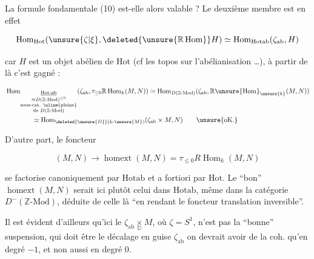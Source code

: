 La formule fondamentale (10) est-elle alors valable ? Le deuxième membre est en effet


\[
\operatorname{Hom}_{\mathrm{Hot}}(\unsure{\zeta|\xi},\deleted{\unsure{\mathbb R\operatorname{Hom}}}H)\simeq
\operatorname{Hom}_{\mathrm{Hotab}}(\zeta_{\mathrm{ab}},H)
\]

car $H$ est un objet abélien de $\mathrm{Hot}$ (cf les topos sur l'abélianisation \ldots), à partir de là c'est gagné :

\[
\begin{aligned}
&\operatorname{Hom}_{\underset{\substack{\approx D(\mathbb Z\text{-}\mathrm{Mod})^{\leq0}\\
\text{sous-cat. }\text{\uline{pleine}}\\\text{de }D(\mathbb Z\text{-}\mathrm{Mod})}}{\underline{\mathrm{Hot}\text{-}\mathrm{ab}}}}
(\zeta_{\mathrm{ab}},\tau_{\leq0}\mathbb R\operatorname{Hom}_k(M,N))
\simeq\operatorname{Hom}_{D(\mathbb Z\text{-}\mathrm{Mod})}
(\zeta_{\mathrm{ab}},\mathbb R\unsure{\operatorname{Hom}}_{\unsure{k}}(M,N))\\
&\hspace{4em}\simeq\operatorname{Hom}_{\deleted{\unsure{D}}(k\text{-}\unsure{M})}(\zeta_{\mathrm{ab}}\times M,N)
\qquad\text{\unsure{oK.}}
\end{aligned}
\]

D'autre part, le foncteur

\[
(M,N)\longrightarrow\operatorname{homext}(M,N)=\tau_{\leq0}R\operatorname{Hom}_k(M,N)
\]

se factorise canoniquement par $\mathrm{Hotab}$ et a fortiori par $\mathrm{Hot}$. Le ``bon'' $\operatorname{homext}(M,N)$ serait ici plutôt celui dans $\mathrm{Hotab}$,  même dans la catégorie $D^{-}(\mathbb Z\text{-}\mathrm{Mod})$, déduite de celle là  ``en rendant le foncteur translation inversible''.

Il est évident d'ailleurs qu'ici le $\zeta_{\mathrm{ab}}\mathbin{\underset{\mathbb D}{\times}}M$, où $\zeta=S^1$, n'est pas la ``bonne'' suspension, qui doit être le décalage  en guise  $\zeta_{\mathrm{ab}}$ on devrait avoir de la coh. qu'en degré $-1$, et non aussi en degré $0$.
